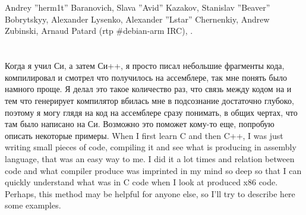 \documentclass[11pt,a4paper,oneside]{book}
\begin{document}
\chapter{}

{Andrey ''herm1t'' Baranovich, Slava ''Avid'' Kazakov, Stanislav ''Beaver'' Bobrytskyy, Alexander Lysenko, 
Alexander ''Lstar'' Chernenkiy, Andrew Zubinski}, Arnaud Patard (rtp  \#debian-arm IRC), 
.

\mainmatter

\chapter{}

\IFRU
{Когда я учил Си, а затем Си++, я просто писал небольшие фрагменты кода, компилировал и смотрел что 
получилось на ассемблере, так мне понять было намного проще. Я делал это такое количество раз, 
что связь между кодом на \CCpp и тем что генерирует компилятор вбилась мне в подсознание достаточно 
глубоко, поэтому я могу глядя на код на ассемблере сразу понимать, в общих чертах, что там было написано 
на Си. Возможно это поможет кому-то еще, попробую описать некоторые примеры.}
{When I first learn C and then C++, I was just writing small pieces of code, compiling it and see what 
is producing in assembly language, that was an easy way to me. I did it a lot times and relation 
between \CCpp code and what compiler produce was imprinted in my mind so deep so that 
I can quickly understand what was in C code when I look at produced x86 code. 
Perhaps, this method may be helpful for anyone else, so I'll try to describe here some examples.}














\end{document}
